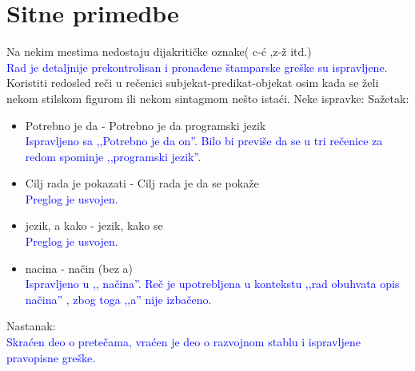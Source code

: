 \documentclass[a4paper]{report}
\newcommand{\odgovor}[1]{\textcolor{black}{#1}}
\newcommand{\odgovorAutora}[1]{\textcolor{blue}{#1}}
\newcommand{\note}[1]{\textcolor{red}{#1}}
\begin{document}
\section{Sitne primedbe}
Na nekim mestima nedostaju dijakritičke oznake( c-ć ,z-ž itd.) \\
\odgovorAutora{Rad je detaljnije prekontrolisan i pronađene štamparske greške su ispravljene.} \\
Koristiti redosled reči u rečenici subjekat-predikat-objekat osim kada se želi nekom stilskom figurom ili nekom sintagmom nešto istaći.\newline
Neke ispravke:\newline
Sažetak:
\begin{itemize}
  \item Potrebno je da - Potrebno je da programski jezik \\
  \odgovorAutora{Ispravljeno sa ,,Potrebno je da on''. Bilo bi previše da se u tri rečenice za redom spominje ,,programski jezik''.}
  \item Cilj rada je pokazati - Cilj rada je da se pokaže \\
  \odgovorAutora{Preglog je usvojen.}
  \item  jezik, a kako  -  jezik, kako se \\
  \odgovorAutora{Preglog je usvojen.}
  \item  nacina - način (bez a) \\
  \odgovorAutora{Ispravljeno u ,, načina''. Reč je upotrebljena u kontekstu ,,rad obuhvata opis načina'' , zbog toga ,,a'' nije izbačeno.}
\end{itemize}
Nastanak: \\
\odgovorAutora{Skraćen deo o pretečama, vraćen je deo o razvojnom stablu i ispravljene pravopisne greške.}
\end{document}
